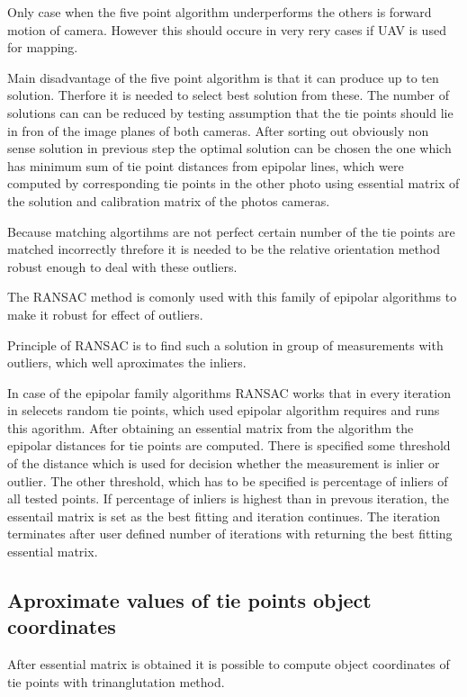 \documentclass[a4paper,12pt]{report}
\begin{document}
Only case when the five point algorithm \cite{nister2004efficient} underperforms 
\cite{bruckner2008experimental} the others is forward motion of camera.
However this should occure in very rery cases  if UAV is used for mapping.

Main disadvantage of the five point algorithm is that it can produce up to ten solution.
Therfore it is needed to select best solution from these. The number of solutions can
can be reduced by testing assumption that the tie points should lie in fron of the image 
planes of both cameras. After sorting out obviously non sense solution in previous step
 the optimal solution can be chosen the one which has minimum sum of tie point distances
 from epipolar lines, which were computed by corresponding tie points in the other photo
 using essential matrix of the solution and calibration matrix of the photos cameras.  

Because matching algortihms are not perfect  certain number of the tie points are matched 
incorrectly threfore it is needed to be the relative orientation method robust enough to
deal with these outliers.

The RANSAC \cite{RANSAC} method is comonly used with this family of epipolar algorithms to 
make it robust for effect of outliers.

Principle of RANSAC is to find such  a solution in group of measurements with outliers, 
which well aproximates the inliers. 

In case of the epipolar family algorithms RANSAC works that in every iteration 
in selecets random tie points, which used epipolar algorithm requires and 
runs this agorithm. After obtaining an essential matrix from the algorithm the epipolar 
distances for tie points are computed. There is specified some threshold of the distance which is used 
for decision whether the measurement is inlier or outlier. The other threshold, which has to be specified 
is percentage of inliers of all tested points. If percentage of inliers is highest than in prevous iteration,
the essentail matrix is set as the best fitting and iteration continues. The iteration terminates after user defined 
number of iterations with returning the best fitting essential matrix.

\subsection{Aproximate values  of tie points object coordinates}

After essential matrix is obtained it is possible to compute object coordinates of tie points with trinanglutation
method.
\end{document}
